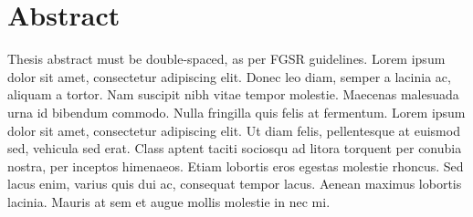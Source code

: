 \chapter{Abstract}
\begin{doublespace}
Thesis abstract must be double-spaced, as per FGSR guidelines. Lorem ipsum dolor sit amet, consectetur adipiscing elit. Donec leo diam, semper a lacinia ac, aliquam a tortor. Nam suscipit nibh vitae tempor molestie. Maecenas malesuada urna id bibendum commodo. Nulla fringilla quis felis at fermentum. Lorem ipsum dolor sit amet, consectetur adipiscing elit. Ut diam felis, pellentesque at euismod sed, vehicula sed erat. Class aptent taciti sociosqu ad litora torquent per conubia nostra, per inceptos himenaeos. Etiam lobortis eros egestas molestie rhoncus. Sed lacus enim, varius quis dui ac, consequat tempor lacus. Aenean maximus lobortis lacinia. Mauris at sem et augue mollis molestie in nec mi.
\end{doublespace}
